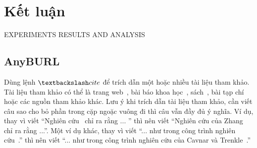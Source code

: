 \chapter{Kết luận}
\label{conclusions}

EXPERIMENTS RESULTS AND ANALYSIS
\section{AnyBURL}

Dùng lệnh $\textbackslash cite$ để trích dẫn một hoặc nhiều tài liệu tham khảo.
Tài liệu tham khảo có thể là trang web~\cite{Listings,HDLVThS}, bài báo khoa học~\cite{1994-Cavnar}, sách~\cite{1984-TeX-Knuth,2006-DDien,2006-NPTV}, bài tạp chí~\cite{1989-TED} hoặc các nguồn tham khảo khác. 
Lưu ý khi trích dẫn tài liệu tham khảo, cần viết câu sao cho bỏ phần trong cặp ngoặc vuông đi thì câu vẫn đầy đủ ý nghĩa.
Ví dụ, thay vì viết ``Nghiên cứu~\cite{1989-TED} chỉ ra rằng ... '' thì nên viết ``Nghiên cứu của Zhang~\cite{1989-TED} chỉ ra rằng ...''.
Một ví dụ khác, thay vì viết ``... như trong công trình nghiên cứu~\cite{1994-Cavnar}.'' thì nên viết ``... như trong công trình nghiên cứu của Cavnar và Trenkle~\cite{1994-Cavnar}.''
